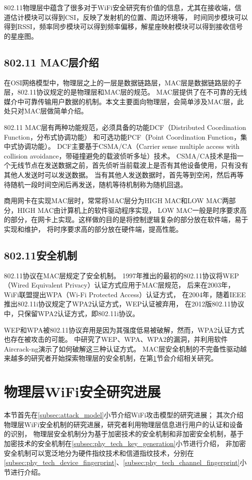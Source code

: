 		802.11物理层中蕴含了很多对于WiFi安全研究有价值的信息，尤其在接收端，信道估计模块可以得到CSI，反映了发射机的位置、周边环境等，
		时间同步模块可以得到RSSI，频率同步模块可以得到频率偏移，解星座映射模块可以得到接收信号的星座图。

		\subsection{802.11 MAC层介绍}
		在OSI网络模型中，物理层之上的一层是数据链路层，MAC层是数据链路层的子层，802.11协议规定的是物理层和MAC层的规范。
		MAC层提供了在不可靠的无线媒介中可靠传输用户数据的机制。本文主要面向物理层，会简单涉及MAC层，此处只对MAC层做简单介绍。

		802.11 MAC层有两种功能规范，必须具备的功能DCF（Distributed Coordination Function，分布式协调功能）
		和可选功能PCF（Point Coordination Function，集中式协调功能）。
		DCF主要基于CSMA/CA（Carrier sense multiple access with collision avoidance，带碰撞避免的载波侦听多址）技术。
		CSMA/CA技术是指一个无线节点在发送数据之前，首先侦听当前载波上是否有其他设备使用，只有没有其他人发送时可以发送数据。
		当有其他人发送数据时，首先等到空闲，然后再等待随机一段时间空闲后再发送，随机等待机制称为随机回退\cite{citsa05backoff}。

		商用网卡在实现MAC层时，常常将MAC层分为HIGH MAC和LOW MAC两部分，HIGH MAC由计算机上的软件驱动程序实现，
		LOW MAC一般是时序要求高的部分，在网卡上实现。这样做的目的是将控制逻辑复杂的部分放在软件端，易于实现和维护，
		将时序要求高的部分放在硬件端，提高性能。

		\subsection{802.11安全机制}\label{subsec:80211security}
		802.11协议在MAC层规定了安全机制。
		1997年推出的最初的802.11协议将WEP（Wired Equivalent Privacy）认证方式应用于MAC层规范，
		后来在2003年，WiFi联盟提出WPA（Wi-Fi Protected Access）认证方式，
		在2004年，随着IEEE推出802.11i协议规定了WPA2认证方式，WEP认证被弃用\cite{wikiwep}，
		在2012版802.11协议中，只保留WPA2认证方式，即802.11i协议\cite{ieee80211}。

		WEP和WPA被802.11协议弃用是因为其强度低易被破解，然而，WPA2认证方式也存在被攻击的可能。
		\cite{ijarcet12wpa2}中研究了WEP、WPA、WPA2的漏洞，并利用软件Aircrack-ng演示了如何破解这三种认证方式。
		MAC层安全机制的不完备性驱动越来越多的研究者开始探索物理层的安全机制，在第\ref{sec:security_research}节会介绍相关研究。

	\section{物理层WiFi安全研究进展}\label{sec:security_research}
	本节首先在\ref{subsec:attack_model}小节介绍WiFi攻击模型的研究进展；
	其次介绍物理层WiFi安全机制的研究进展，研究者利用物理层信息进行用户的认证和设备的识别，
	物理层安全机制分为基于加密技术的安全机制和非加密安全机制，基于加密技术的安全机制在\ref{subsec:phy_tech_key_generation}小节进行介绍，
	非加密安全机制可以宽泛地分为硬件指纹技术和信道指纹技术\cite{ieeewc10noncryp, mobicom08radiometric}，分别在
	\ref{subsec:phy_tech_device_fingerprint}、\ref{subsec:phy_tech_channel_fingerprint}小节进行介绍。
